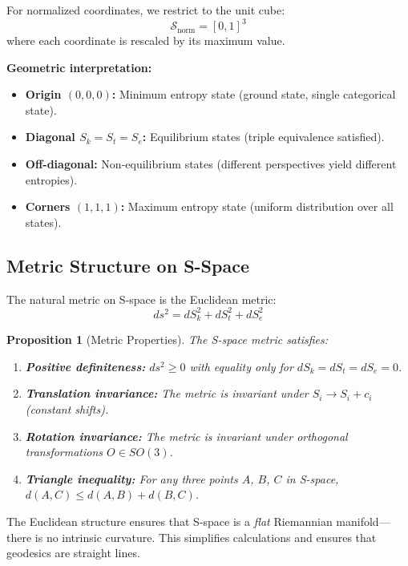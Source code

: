 \documentclass[twocolumn,10pt]{article}
\newtheorem{proposition}[theorem]{Proposition}
\theoremstyle{remark}
\begin{document}
For normalized coordinates, we restrict to the unit cube:
\begin{equation}
    \mathcal{S}_{\text{norm}} = [0, 1]^3
    \label{eq:S_space_normalized}
\end{equation}
where each coordinate is rescaled by its maximum value.

\textbf{Geometric interpretation:}
\begin{itemize}
    \item \textbf{Origin $(0,0,0)$:} Minimum entropy state (ground state, single categorical state).
    \item \textbf{Diagonal $S_k = S_t = S_e$:} Equilibrium states (triple equivalence satisfied).
    \item \textbf{Off-diagonal:} Non-equilibrium states (different perspectives yield different entropies).
    \item \textbf{Corners $(1,1,1)$:} Maximum entropy state (uniform distribution over all states).
\end{itemize}

\subsection{Metric Structure on S-Space}

The natural metric on S-space is the Euclidean metric:
\begin{equation}
    ds^2 = dS_k^2 + dS_t^2 + dS_e^2
    \label{eq:S_metric}
\end{equation}

\begin{proposition}[Metric Properties]
\label{prop:metric_properties}
The S-space metric satisfies:
\begin{enumerate}
    \item \textbf{Positive definiteness:} $ds^2 \geq 0$ with equality only for $dS_k = dS_t = dS_e = 0$.
    \item \textbf{Translation invariance:} The metric is invariant under $S_i \to S_i + c_i$ (constant shifts).
    \item \textbf{Rotation invariance:} The metric is invariant under orthogonal transformations $O \in SO(3)$.
    \item \textbf{Triangle inequality:} For any three points $A$, $B$, $C$ in S-space, $d(A,C) \leq d(A,B) + d(B,C)$.
\end{enumerate}
\end{proposition}

The Euclidean structure ensures that S-space is a \textit{flat} Riemannian manifold—there is no intrinsic curvature. This simplifies calculations and ensures that geodesics are straight lines.
\end{document}

